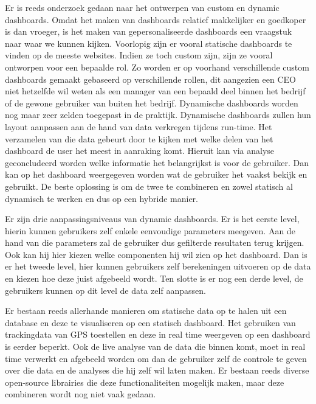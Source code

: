 \documentclass{hogent-article}
\begin{document}
    
    Er is reeds onderzoek gedaan naar het ontwerpen van custom en dynamic dashboards. Omdat het maken van dashboards relatief makkelijker en goedkoper is dan vroeger, is het maken van gepersonaliseerde dashboards een vraagstuk naar waar we kunnen kijken. Voorlopig zijn er vooral statische dashboards te vinden op de meeste websites. Indien ze toch custom zijn, zijn ze vooral ontworpen voor een bepaalde rol. Zo worden er op voorhand verschillende custom dashboards gemaakt gebaseerd op verschillende rollen, dit aangezien een CEO niet hetzelfde wil weten als een manager van een bepaald deel binnen het bedrijf of de gewone gebruiker van buiten het bedrijf. Dynamische dashboards worden nog maar zeer zelden toegepast in de praktijk. Dynamische dashboards zullen hun layout aanpassen aan de hand van data verkregen tijdens run-time. Het verzamelen van die data gebeurt door te kijken met welke delen van het dashboard de user het meest in aanraking komt. Hieruit kan via analyse geconcludeerd worden welke informatie het belangrijkst is voor de gebruiker. Dan kan op het dashboard weergegeven worden wat de gebruiker het vaakst bekijk en gebruikt. De beste oplossing is om de twee te combineren en zowel statisch al dynamisch te werken en dus op een hybride manier. \autocite{Kruglov2021}
    
    
    Er zijn drie aanpassingsniveaus van dynamic dashboards. Er is het eerste level, hierin kunnen gebruikers zelf enkele eenvoudige parameters meegeven. Aan de hand van die parameters zal de gebruiker dus gefilterde resultaten terug krijgen. Ook kan hij hier kiezen welke componenten hij wil zien op het dashboard. Dan is er het tweede level, hier kunnen gebruikers zelf berekeningen uitvoeren op de data en kiezen hoe deze juist afgebeeld wordt. Ten slotte is er nog een derde level, de gebruikers kunnen op dit level de data zelf aanpassen.\autocite{Ji2014}
    
    
    Er bestaan reeds allerhande manieren om statische data op te halen uit een database en deze te visualiseren op een statisch dashboard. Het gebruiken van trackingdata van GPS toestellen en deze in real time weergeven op een dashboard is eerder beperkt. Ook de live analyse van de data die binnen komt, moet in real time verwerkt en afgebeeld worden om dan de gebruiker zelf de controle te geven over die data en de analyses die hij zelf wil laten maken. Er bestaan reeds diverse open-source librairies die deze functionaliteiten mogelijk maken, maar deze combineren wordt nog niet vaak gedaan.
    \pagebreak
\end{document}
